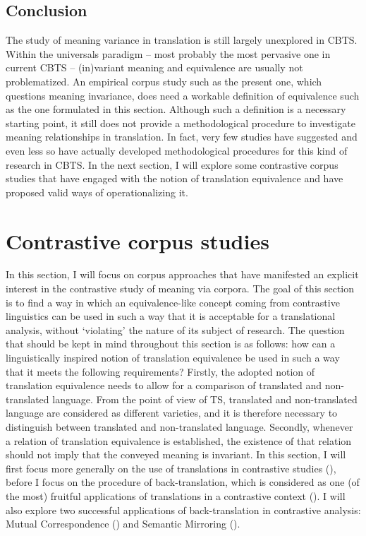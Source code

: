 \subsection{Conclusion}
\label{sec:2.2.5}  
The study of meaning variance in translation is still largely unexplored in CBTS. Within the universals paradigm – most probably the most pervasive one in current CBTS – (in)variant meaning and equivalence are usually not problematized. An empirical corpus study such as the present one, which questions meaning invariance, does need a workable definition of equivalence such as the one formulated in this section. Although such a definition is a necessary starting point, it still does not provide a methodological procedure to investigate meaning relationships in translation. In fact, very few studies have suggested and even less so have actually developed methodological procedures for this kind of research in CBTS. In the next section, I will explore some contrastive corpus studies that have engaged with the notion of translation equivalence and have proposed valid ways of operationalizing it.

\section{Contrastive corpus studies}
\label{sec:2.3}  
In this section, I will focus on corpus approaches that have manifested an explicit interest in the contrastive study of meaning via corpora. The goal of this section is to find a way in which an equivalence-like concept coming from contrastive linguistics can be used in such a way that it is acceptable for a translational analysis, without ‘violating’ the nature of its subject of research. The question that should be kept in mind throughout this section is as follows: how can a linguistically inspired notion of translation equivalence be used in such a way that it meets the following requirements? Firstly, the adopted notion of translation equivalence needs to allow for a comparison of translated and non-translated language. From the point of view of TS, translated and non-translated language are considered as different varieties, and it is therefore necessary to distinguish between translated and non-translated language. Secondly, whenever a relation of translation equivalence is established, the existence of that relation should not imply that the conveyed meaning is invariant. In this section, I will first focus more generally on the use of translations in contrastive studies (), before I focus on the procedure of back-translation, which is considered as one (of the most) fruitful applications of translations in a contrastive context (). I will also explore two successful applications of back-translation in contrastive analysis: Mutual Correspondence () and Semantic Mirroring ().

